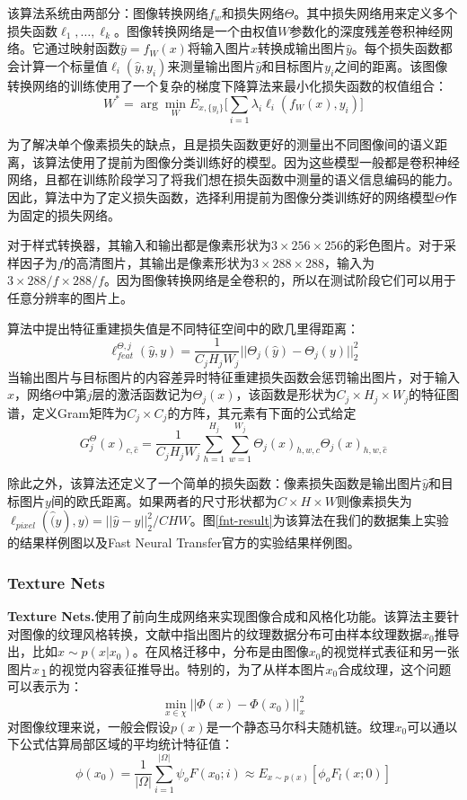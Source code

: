 该算法系统由两部分：图像转换网络$f_w$和损失网络$\Theta$。其中损失网络用来定义多个损失函数$\ell_1,\dots,\ell_k$。图像转换网络是一个由权值$W$参数化的深度残差卷积神经网络。它通过映射函数$\hat{y}=f_W(x)$将输入图片$x$转换成输出图片$\hat{y}$。每个损失函数都会计算一个标量值$\ell_i(\hat{y},y_i)$来测量输出图片$\hat{y}$和目标图片$y_i$之间的距离。该图像转换网络的训练使用了一个复杂的梯度下降算法来最小化损失函数的权值组合：
$$W^*=\arg \min_W E_{x,\{y_i\}}\Big[\sum_{i=1}\lambda_i\ell_i(f_W(x),y_i)\Big]$$

为了解决单个像素损失的缺点，且是损失函数更好的测量出不同图像间的语义距离，该算法使用了提前为图像分类训练好的模型。因为这些模型一般都是卷积神经网络，且都在训练阶段学习了将我们想在损失函数中测量的语义信息编码的能力。因此，算法中为了定义损失函数，选择利用提前为图像分类训练好的网络模型$\Theta$作为固定的损失网络。

对于样式转换器，其输入和输出都是像素形状为$3\times 256 \times 256$的彩色图片。对于采样因子为$f$的高清图片，其输出是像素形状为$3\times288\times288$，输入为$3\times288/f\times288/f$。因为图像转换网络是全卷积的，所以在测试阶段它们可以用于任意分辨率的图片上。

算法中提出特征重建损失值是不同特征空间中的欧几里得距离：
$$\ell_{feat}^{\Theta,j}(\hat{y},y)=\frac{1}{C_jH_jW_j}||\Theta_j(\hat{y})-\Theta_j(y)||_2^2$$
当输出图片与目标图片的内容差异时特征重建损失函数会惩罚输出图片，对于输入$x$，网络$\Theta$中第$j$层的激活函数记为$\Theta_j(x)$，该函数是形状为$C_j\times H_j\times W_j$的特征图谱，定义Gram矩阵为$C_j\times C_j$的方阵，其元素有下面的公式给定
$$G_j^{\Theta}(x)_{c,\hat{c}}=\frac{1}{C_jH_jW_j}\sum_{h=1}^{H_j}\sum_{w=1}^{W_j}\Theta_j(x)_{h,w,c}\Theta_j(x)_{h,w,\hat{c}}$$

除此之外，该算法还定义了一个简单的损失函数：像素损失函数是输出图片$\hat{y}$和目标图片$y$间的欧氏距离。如果两者的尺寸形状都为$C\times H\times W$则像素损失为$\ell_{pixel}(\hat(y),y)=||\hat{y}-y||_2^2/CHW$。图\ref{fnt-result}为该算法在我们的数据集上实验的结果样例图以及Fast Neural Transfer官方的实验结果样例图。 


\subsubsection{Texture Nets}

\textbf{Texture Nets.}\cite{texture-nets}\quad 使用了前向生成网络来实现图像合成和风格化功能。该算法主要针对图像的纹理风格转换，文献\cite{texture-nets}中指出图片的纹理数据分布可由样本纹理数据$x_0$推导出，比如$x\sim p(x|x_0)$。在风格迁移中，分布是由图像$x_0$的视觉样式表征和另一张图片$x_１$的视觉内容表征推导出。特别的，为了从样本图片$x_0$合成纹理，这个问题可以表示为：
$$\min_{x\in \chi}||\Phi(x)-\Phi(x_0)||_x^2$$
对图像纹理来说，一般会假设$p(x)$是一个静态马尔科夫随机链。纹理$x_0$可以通以下公式估算局部区域的平均统计特征值：
$$\phi(x_0)=\frac{1}{|\Omega|}\sum_{i=1}^{|\Omega|}\psi_oF(x_0;i)\approx E_{x\sim p(x)}[\phi_oF_l(x;0)]$$

